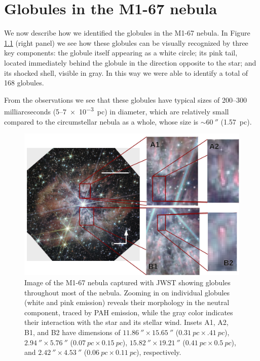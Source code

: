 \documentclass{book}
\begin{document}
\chapter{Globules in the M1-67 nebula} \label{Chapter : 3}

We now describe how we identified the globules in the M1-67 nebula. In
Figure \ref{fig:nudos WR124} (right panel) we see how these globules
can be visually recognized by three key components: the globule itself
appearing as a white circle; its pink tail, located immediately behind
the globule in the direction opposite to the star; and its shocked
shell, visible in gray. In this way we were able to identify a total
of 168 globules.

From the observations we see that these globules have typical sizes of
200--300 milliarcseconds (5--\SI{7e-3}{pc}) in diameter, which are
relatively small compared to the circumstellar nebula as a whole,
whose size is $\sim\SI{60}{\arcsecond}$ (\SI{1.57}{pc}).

\begin{figure}[htb]
    \centering
    \includegraphics[width=\textwidth]{ultimas correcciones/WR124_glo_ej.pdf}
    \caption{Image of the M1-67 nebula captured with JWST showing
      globules throughout most of the nebula. Zooming in on individual
      globules (white and pink emission) reveals their morphology in
      the neutral component, traced by PAH emission, while the gray
      color indicates their interaction with the star and its stellar
      wind. Insets A1, A2, B1, and B2 have dimensions of
      $\SI{11.86}{\arcsecond}\times\SI{15.65}{\arcsecond}$
      ($\SI{0.31}{pc}\times\SI{.41}{pc}$),
      $\SI{2.94}{\arcsecond}\times\SI{5.76}{\arcsecond}$
      ($\SI{0.07}{pc}\times\SI{0.15}{pc}$),
      $\SI{15.82}{\arcsecond}\times\SI{19.21}{\arcsecond}$
      ($\SI{0.41}{pc}\times\SI{0.5}{pc}$), and
      $\SI{2.42}{\arcsecond}\times\SI{4.53}{\arcsecond}$
      ($\SI{0.06}{pc}\times\SI{0.11}{pc}$), respectively.}
    \label{fig:nudos WR124}
\end{figure}
\end{document}
